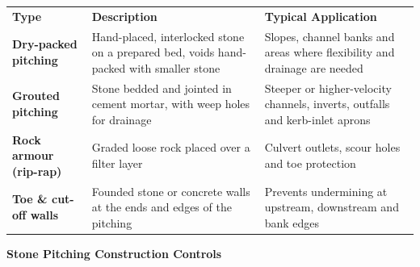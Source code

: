 {\fontsize{7.4pt}{9.0pt}\selectfont\noindent
\renewcommand{\arraystretch}{1.18}
\begin{tabularx}{\textwidth}{@{}p{3.2cm} p{6.4cm} X@{}}
\rowcolor{mhnavy}
{\color{white}\bfseries Type} & {\color{white}\bfseries Description} & {\color{white}\bfseries Typical Application} \\
\rowcolor{mhbluelight}
\bfseries Dry-packed pitching & Hand-placed, interlocked stone on a prepared bed, voids hand-packed with smaller stone & Slopes, channel banks and areas where flexibility and drainage are needed \\
\bfseries Grouted pitching & Stone bedded and jointed in cement mortar, with weep holes for drainage & Steeper or higher-velocity channels, inverts, outfalls and kerb-inlet aprons \\
\rowcolor{mhbluelight}
\bfseries Rock armour (rip-rap) & Graded loose rock placed over a filter layer & Culvert outlets, scour holes and toe protection \\
\bfseries Toe \& cut-off walls & Founded stone or concrete walls at the ends and edges of the pitching & Prevents undermining at upstream, downstream and bank edges \\
\end{tabularx}
\renewcommand{\arraystretch}{1}
}

\clearpage


\noindent
{\large\bfseries\color{mhnavy} Stone Pitching Construction Controls}
\vspace{0.12cm}

\noindent
\begin{minipage}[t]{0.185\textwidth}\end{minipage}\hfill
\begin{minipage}[t]{0.185\textwidth}\end{minipage}\hfill
\begin{minipage}[t]{0.185\textwidth}\end{minipage}\hfill
\begin{minipage}[t]{0.185\textwidth}\end{minipage}\hfill
\begin{minipage}[t]{0.185\textwidth}\end{minipage}

